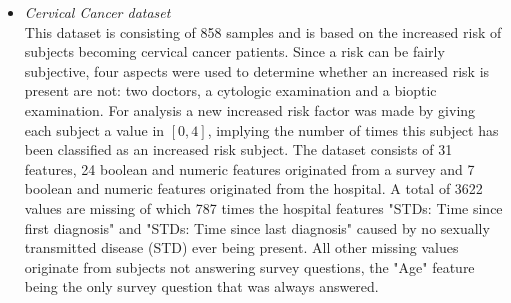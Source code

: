 \documentclass[10pt,a4paper]{article}
\begin{document}
\begin{itemize}
		\item \textit{Cervical Cancer dataset} \\ This dataset is consisting of 858 samples and is based on the increased risk of subjects becoming cervical cancer patients. Since a risk can be fairly subjective, four aspects were used to determine whether an increased risk is present are not: two doctors, a cytologic examination and a bioptic examination. For analysis a new increased risk factor was made by giving each subject a value in $[0, 4]$, implying the number of times this subject has been classified as an increased risk subject. The dataset consists of 31 features, 24 boolean and numeric features originated from a survey and 7 boolean and numeric features originated from the hospital. A total of 3622 values are missing of which 787 times the hospital features "STDs: Time since first diagnosis" and "STDs: Time since last diagnosis" caused by no sexually transmitted disease (STD) ever being present. All other missing values originate from subjects not answering survey questions, the "Age" feature being the only survey question that was always answered\cite{fernandes2017transfer}.
	\end{itemize}
	
\end{document}
